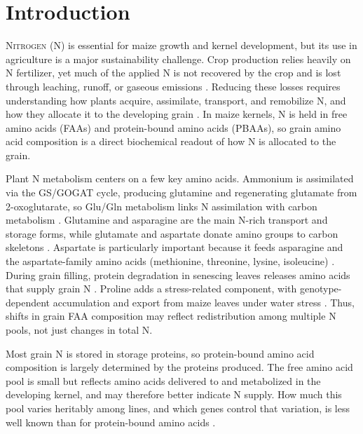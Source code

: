 
\section{Introduction}

\lettrine[lines=2]{\color{color2}N}{itrogen} (N) is essential for maize growth and kernel development, but its use in agriculture is a major sustainability challenge. Crop production relies heavily on N fertilizer, yet much of the applied N is not recovered by the crop and is lost through leaching, runoff, or gaseous emissions \citep{OjedaRivera2025NitrogenEfficientMaize}. Reducing these losses requires understanding how plants acquire, assimilate, transport, and remobilize N, and how they allocate it to the developing grain \citep{MasclauxDaubresse2010NUE,Have2017NRemobilization}. In maize kernels, N is held in free amino acids (FAAs) and protein-bound amino acids (PBAAs), so grain amino acid composition is a direct biochemical readout of how N is allocated to the grain.

Plant N metabolism centers on a few key amino acids. Ammonium is assimilated via the GS/GOGAT cycle, producing glutamine and regenerating glutamate from 2-oxoglutarate, so Glu/Gln metabolism links N assimilation with carbon metabolism \citep{MasclauxDaubresse2010NUE,Hodges2002TwoOxoglutarate}. Glutamine and asparagine are the main N-rich transport and storage forms, while glutamate and aspartate donate amino groups to carbon skeletons \citep{Bernard2009CytosolicGS,MasclauxDaubresse2010NUE}. Aspartate is particularly important because it feeds asparagine and the aspartate-family amino acids (methionine, threonine, lysine, isoleucine) \citep{Viola2001AspartatePathway,Wang2018AspSeeds,Han2021Aspartate}. During grain filling, protein degradation in senescing leaves releases amino acids that supply grain N \citep{Have2017NRemobilization,Liu2008ProteinDegradationNRemobilization}. Proline adds a stress-related component, with genotype-dependent accumulation and export from maize leaves under water stress \citep{Carceller1999ProlineRemobilization}. Thus, shifts in grain FAA composition may reflect redistribution among multiple N pools, not just changes in total N.

Most grain N is stored in storage proteins, so protein-bound amino acid composition is largely determined by the proteins produced. The free amino acid pool is small but reflects amino acids delivered to and metabolized in the developing kernel, and may therefore better indicate N supply. How much this pool varies heritably among lines, and which genes control that variation, is less well known than for protein-bound amino acids \citep{Shrestha2022}.

